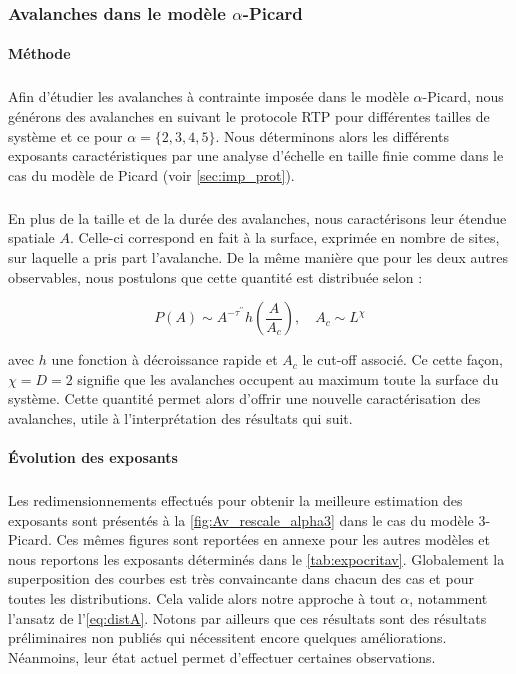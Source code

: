 \subsubsection{Avalanches dans le modèle $\alpha$-Picard}

\label{sec:Av_PicardMain}

\paragraph{Méthode}

\subparagraph{}Afin d'étudier les avalanches à contrainte imposée dans le modèle $\alpha$-Picard, nous générons des avalanches en suivant le protocole RTP pour différentes tailles de système et ce pour $\alpha = \{2, 3, 4, 5\}$. Nous déterminons alors les différents exposants caractéristiques par une analyse d'échelle en taille finie comme dans le cas du modèle de Picard (voir \autoref{sec:imp_prot}). 

\subparagraph{}En plus de la taille et de la durée des avalanches, nous caractérisons leur étendue spatiale $A$. Celle-ci correspond en fait à la surface, exprimée en nombre de sites, sur laquelle a pris part l'avalanche. De la même manière que pour les deux autres observables, nous postulons que cette quantité est distribuée selon :

\begin{equation}
	P(A) \sim A^{-\tau^{\prime\prime}}h\left( \frac{A}{A_c} \right),\quad A_c \sim L^\chi
	\label{eq:distA}
\end{equation}

\noindent avec $h$ une fonction à décroissance rapide et $A_c$ le cut-off associé. Ce cette façon, $\chi=D=2$ signifie que les avalanches occupent au maximum toute la surface du système. Cette quantité permet alors d'offrir une nouvelle caractérisation des avalanches, utile à l'interprétation des résultats qui suit.

\paragraph{\'Evolution des exposants}

\subparagraph{}Les redimensionnements effectués pour obtenir la meilleure estimation des exposants sont présentés à la \autoref{fig:Av_rescale_alpha3} dans le cas du modèle 3-Picard. Ces mêmes figures sont reportées en annexe pour les autres modèles et nous reportons les exposants déterminés dans le \autoref{tab:expocritav}. Globalement la superposition des courbes est très convaincante dans chacun des cas et pour toutes les distributions. Cela valide alors notre approche à tout $\alpha$, notamment l'ansatz de l'\autoref{eq:distA}. Notons par ailleurs que ces résultats sont des résultats préliminaires non publiés qui nécessitent encore quelques améliorations. Néanmoins, leur état actuel permet d'effectuer certaines observations.

